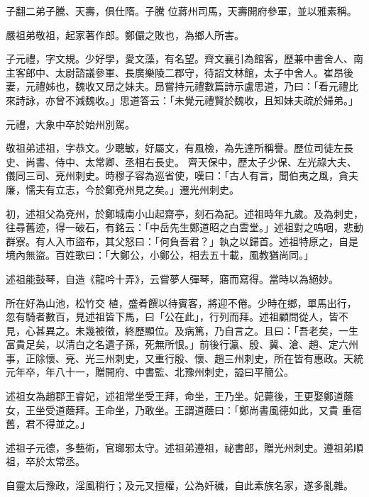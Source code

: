 \begin{pinyinscope}
 子翻二弟子騰、天壽，俱仕隋。子騰
 位蔣州司馬，天壽開府參軍，並以雅素稱。



 嚴祖弟敬祖，起家著作郎。鄭儼之敗也，為鄉人所害。



 子元禮，字文規。少好學，愛文藻，有名望。齊文襄引為館客，歷兼中書舍人、南主客郎中、太尉諮議參軍、長廣樂陵二郡守，待詔文林館，太子中舍人。崔昂後妻，元禮姊也，魏收又昂之妹夫。昂嘗持元禮數篇詩示盧思道，乃曰：「看元禮比來詩詠，亦曾不減魏收。」思道答云：「未覺元禮賢於魏收，且知妹夫疏於婦弟。」



 元禮，大象中卒於始州別駕。



 敬祖弟述祖，字恭文。少聰敏，好屬文，有風檢，為先達所稱譽。歷位司徒左長史、尚書、侍中、太常卿、丞相右長史。
 齊天保中，歷太子少保、左光祿大夫、儀同三司、兗州刺史。時穆子容為巡省使，嘆曰：「古人有言，聞伯夷之風，貪夫廉，懦夫有立志，今於鄭兗州見之矣。」遷光州刺史。



 初，述祖父為兗州，於鄭城南小山起齋亭，刻石為記。述祖時年九歲。及為刺史，往尋舊迹，得一破石，有銘云：「中岳先生鄭道昭之白雲堂。」述祖對之嗚咽，悲動群寮。有人入市盜布，其父怒曰：「何負吾君？」執之以歸首。述祖特原之，自是境內無盜。百姓歌曰：「大鄭公，小鄭公，相去五十載，風教猶尚同。」



 述祖能鼓琴，自造《龍吟十弄》，云嘗夢人彈琴，寤而寫得。當時以為絕妙。



 所在好為山池，松竹交
 植，盛肴饌以待賓客，將迎不倦。少時在鄉，單馬出行，忽有騎者數百，見述祖皆下馬，曰「公在此」，行列而拜。述祖顧問從人，皆不見，心甚異之。未幾被徵，終歷顯位。及病篤，乃自言之。且曰：「吾老矣，一生富貴足矣，以清白之名遺子孫，死無所恨。」前後行瀛、殷、冀、滄、趙、定六州事，正除懷、兗、光三州刺史，又重行殷、懷、趙三州刺史，所在皆有惠政。天統元年卒，年八十一，贈開府、中書監、北豫州刺史，謚曰平簡公。



 述祖女為趙郡王睿妃，述祖常坐受王拜，命坐，王乃坐。妃薨後，王更娶鄭道蔭女，王坐受道蔭拜。王命坐，乃敢坐。王謂道蔭曰：「鄭尚書風德如此，又貴
 重宿舊，君不得並之。」



 述祖子元德，多藝術，官瑯邪太守。述祖弟遵祖，祕書郎，贈光州刺史。遵祖弟順祖，卒於太常丞。



 自靈太后豫政，淫風稍行；及元叉擅權，公為奸穢，自此素族名家，遂多亂雜。




\end{pinyinscope}
